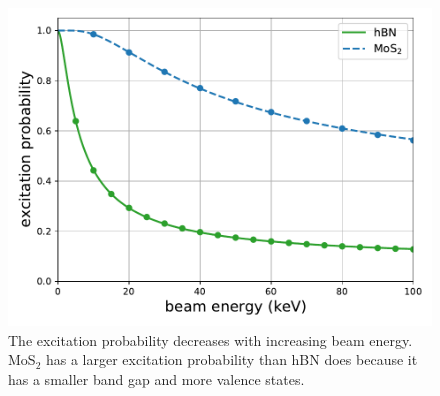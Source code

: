 \documentclass{article}
\begin{document}
\begin{figure}
    \centering
    \includegraphics[width=.7\textwidth]{images/pVsEb.pdf}
    \caption{
    The excitation probability decreases with increasing beam energy. MoS$_2$ has a larger excitation probability than hBN does because it has a smaller band gap and more valence states.
    }
    \label{fig:pVsEb}
\end{figure}
\end{document}
